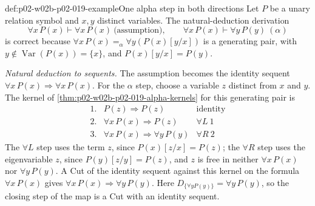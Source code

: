 \begin{hbexample}{def:p02-w02b-p02-019-example}{One alpha step in both directions}
Let \(P\) be a unary relation symbol and \(x,y\) distinct variables.  The
natural-deduction derivation
\[
 \forall x\,P(x)\vdash\forall x\,P(x)\ \text{(assumption)},\qquad
 \forall x\,P(x)\vdash\forall y\,P(y)\ (\alpha)
\]
is correct because \(\forall x\,P(x)=_{\alpha}\forall y(P(x)[y/x])\) is a
generating pair, with \(y\notin\operatorname{Var}(P(x))=\{x\}\), and
\(P(x)[y/x]=P(y)\).

\emph{Natural deduction to sequents.}  The assumption becomes the identity
sequent \(\forall x\,P(x)\Rightarrow\forall x\,P(x)\).  For the \(\alpha\)
step, choose a variable \(z\) distinct from \(x\) and \(y\).  The kernel of
\cref{thm:p02-w02b-p02-019-alpha-kernels} for this generating pair is
\[
\begin{array}{rll}
 1.&P(z)\Rightarrow P(z)&\text{identity}\\
 2.&\forall x\,P(x)\Rightarrow P(z)&\forall L\ 1\\
 3.&\forall x\,P(x)\Rightarrow\forall y\,P(y)&\forall R\ 2
\end{array}
\]
The \(\forall L\) step uses the term \(z\), since \(P(x)[z/x]=P(z)\); the
\(\forall R\) step uses the eigenvariable \(z\), since \(P(y)[z/y]=P(z)\),
and \(z\) is free in neither \(\forall x\,P(x)\) nor \(\forall y\,P(y)\).  A
Cut of the identity sequent against this kernel on the formula
\(\forall x\,P(x)\) gives \(\forall x\,P(x)\Rightarrow\forall y\,P(y)\).
Here \(D_{\{\forall y P(y)\}}=\forall y\,P(y)\), so the closing step of the
map is a Cut with an identity sequent.


\end{hbexample}
